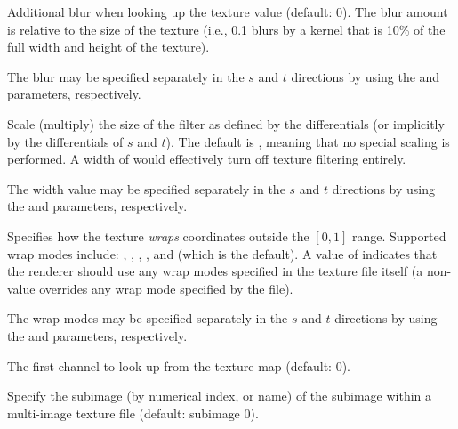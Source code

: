 \documentclass[11pt,letterpaper]{book}
\begin{document}
\vspace{12pt}
Additional blur when looking up the texture value (default: 0).  The
blur amount is relative to the size of the texture (i.e., 0.1 blurs by a
kernel that is 10\% of the full width and height of the texture).

The blur may be specified separately in the $s$ and $t$ directions by
using the  and  parameters, respectively.
\apiend
\vspace{-16pt}

\vspace{12pt}
Scale (multiply) the size of the filter as defined by the differentials
(or implicitly by the differentials of $s$ and $t$).  The default is
{}, meaning that no special scaling is performed.  A width of
{} would effectively turn off texture filtering entirely.

The width value may be specified separately in the $s$ and $t$
directions by using the  and  parameters,
respectively.
\apiend
\vspace{-16pt}

\vspace{12pt}

Specifies how the texture \emph{wraps} coordinates outside the $[0,1]$
range.  Supported wrap modes include: , ,
, , and  (which is the default).  A
value of  indicates that the renderer should use any wrap
modes specified in the texture file itself (a non- value
overrides any wrap mode specified by the file).

The wrap modes may be specified separately in the $s$ and $t$ directions
by using the  and  parameters, respectively.
\apiend
\vspace{-16pt}

\vspace{12pt}
The first channel to look up from the texture map (default: 0).
\apiend
\vspace{-16pt}

\vspace{12pt}
Specify the subimage (by numerical index, or name) of the subimage
within a multi-image texture file (default: subimage 0).
\apiend
\vspace{-16pt}
\end{document}
